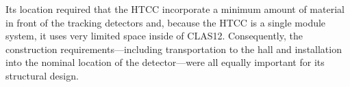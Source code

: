 Its location required that the HTCC incorporate a minimum amount of material in front of the tracking detectors and, because the HTCC is a single module system, it uses very limited space inside of CLAS12. Consequently, the construction requirements---including transportation to the hall and installation into the nominal location of the detector---were all equally important for its structural design. 






